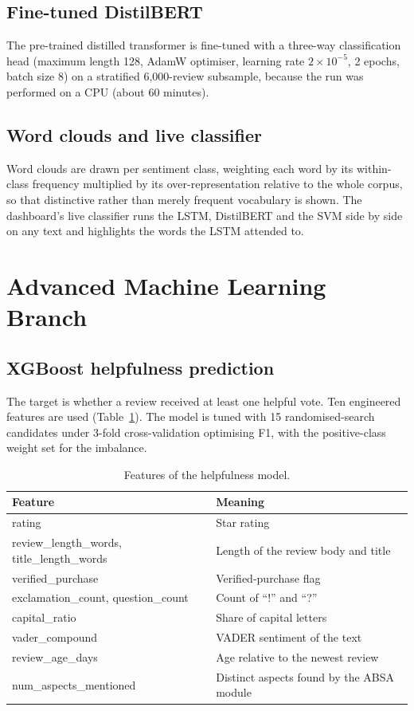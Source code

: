 \documentclass[12pt,a4paper]{report}
\begin{document}
\subsection{Fine-tuned DistilBERT}
The pre-trained distilled transformer is fine-tuned with a three-way classification head (maximum length 128, AdamW optimiser, learning rate $2\times10^{-5}$, 2 epochs, batch size 8) on a stratified 6,000-review subsample, because the run was performed on a CPU (about 60 minutes).
\subsection{Word clouds and live classifier}
Word clouds are drawn per sentiment class, weighting each word by its within-class frequency multiplied by its over-representation relative to the whole corpus, so that distinctive rather than merely frequent vocabulary is shown. The dashboard's live classifier runs the LSTM, DistilBERT and the SVM side by side on any text and highlights the words the LSTM attended to.

\section{Advanced Machine Learning Branch}
\subsection{XGBoost helpfulness prediction}
The target is whether a review received at least one helpful vote. Ten engineered features are used (Table~\ref{tab:xgbfeat}). The model is tuned with 15 randomised-search candidates under 3-fold cross-validation optimising F1, with the positive-class weight set for the imbalance.
\begin{table}[htbp]
\centering
\caption{Features of the helpfulness model.}\label{tab:xgbfeat}
\small
\begin{tabularx}{\textwidth}{@{}>{\raggedright\arraybackslash}p{4.2cm}X@{}}
\toprule
Feature & Meaning \\
\midrule
rating & Star rating \\
review\_length\_words, title\_length\_words & Length of the review body and title \\
verified\_purchase & Verified-purchase flag \\
exclamation\_count, question\_count & Count of ``!'' and ``?'' \\
capital\_ratio & Share of capital letters \\
vader\_compound & VADER sentiment of the text \\
review\_age\_days & Age relative to the newest review \\
num\_aspects\_mentioned & Distinct aspects found by the ABSA module \\
\bottomrule
\end{tabularx}
\end{table}
\end{document}
